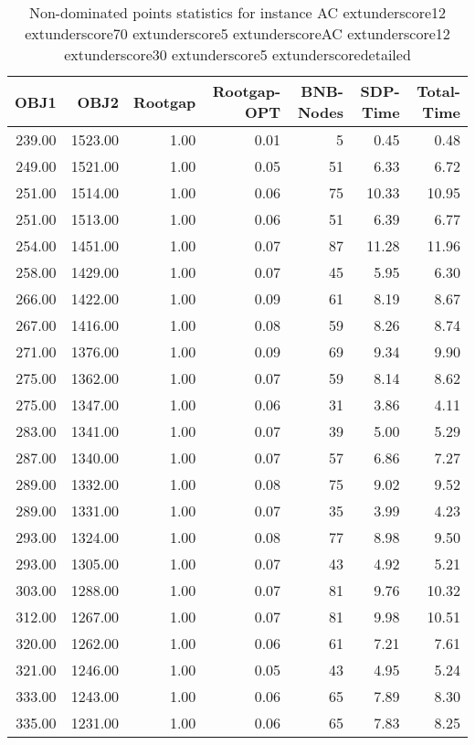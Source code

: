 \begin{table}
\caption{Non-dominated points statistics for instance AC	extunderscore12	extunderscore70	extunderscore5	extunderscoreAC	extunderscore12	extunderscore30	extunderscore5	extunderscoredetailed}
\label{tab:plots/AC_12_70_5_AC_12_30_5_detailed}
\begin{tabular}{rrrrrrr}
\toprule
OBJ1 & OBJ2 & Rootgap & Rootgap-OPT & BNB-Nodes & SDP-Time & Total-Time \\
\midrule
239.00 & 1523.00 & 1.00 & 0.01 & 5 & 0.45 & 0.48 \\
249.00 & 1521.00 & 1.00 & 0.05 & 51 & 6.33 & 6.72 \\
251.00 & 1514.00 & 1.00 & 0.06 & 75 & 10.33 & 10.95 \\
251.00 & 1513.00 & 1.00 & 0.06 & 51 & 6.39 & 6.77 \\
254.00 & 1451.00 & 1.00 & 0.07 & 87 & 11.28 & 11.96 \\
258.00 & 1429.00 & 1.00 & 0.07 & 45 & 5.95 & 6.30 \\
266.00 & 1422.00 & 1.00 & 0.09 & 61 & 8.19 & 8.67 \\
267.00 & 1416.00 & 1.00 & 0.08 & 59 & 8.26 & 8.74 \\
271.00 & 1376.00 & 1.00 & 0.09 & 69 & 9.34 & 9.90 \\
275.00 & 1362.00 & 1.00 & 0.07 & 59 & 8.14 & 8.62 \\
275.00 & 1347.00 & 1.00 & 0.06 & 31 & 3.86 & 4.11 \\
283.00 & 1341.00 & 1.00 & 0.07 & 39 & 5.00 & 5.29 \\
287.00 & 1340.00 & 1.00 & 0.07 & 57 & 6.86 & 7.27 \\
289.00 & 1332.00 & 1.00 & 0.08 & 75 & 9.02 & 9.52 \\
289.00 & 1331.00 & 1.00 & 0.07 & 35 & 3.99 & 4.23 \\
293.00 & 1324.00 & 1.00 & 0.08 & 77 & 8.98 & 9.50 \\
293.00 & 1305.00 & 1.00 & 0.07 & 43 & 4.92 & 5.21 \\
303.00 & 1288.00 & 1.00 & 0.07 & 81 & 9.76 & 10.32 \\
312.00 & 1267.00 & 1.00 & 0.07 & 81 & 9.98 & 10.51 \\
320.00 & 1262.00 & 1.00 & 0.06 & 61 & 7.21 & 7.61 \\
321.00 & 1246.00 & 1.00 & 0.05 & 43 & 4.95 & 5.24 \\
333.00 & 1243.00 & 1.00 & 0.06 & 65 & 7.89 & 8.30 \\
335.00 & 1231.00 & 1.00 & 0.06 & 65 & 7.83 & 8.25 \\

\end{tabular}
\end{table}
